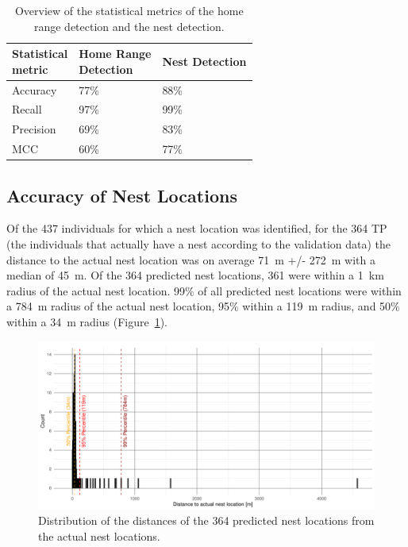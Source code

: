 \vspace{1\baselineskip}

\begin{table}[H]
\begin{center}
\caption[Statistical metrics of the home range detection and the nest detection]{Overview of the statistical metrics of the home range detection and the nest detection.}
\label{table:stats_hr_and_nest}
\begin{tabular}{| p{3cm} | p{3cm} | p{3cm} |} 
\cline{1-3}
\textbf{Statistical \newline metric} & \textbf{Home Range \newline Detection} & \textbf{Nest Detection} \\
\hline
Accuracy & 77\% & 88\% \\ 
\hline
Recall & 97\% & 99\% \\
\hline
Precision & 69\% & 83\% \\
\hline
MCC & 60\% & 77\% \\
\hline
\end{tabular}
\end{center}
\end{table}



\newpage
\subsection{Accuracy of Nest Locations}
Of the 437 individuals for which a nest location was identified, for the 364 TP (the individuals that actually have a nest according to the validation data) the distance to the actual nest location was on average 71~m +/- 272~m with a median of 45~m. Of the 364 predicted nest locations, 361 were within a 1~km radius of the actual nest location. 99\% of all predicted nest locations were within a 784~m radius of the actual nest location, 95\% within a 119~m radius, and 50\% within a 34~m radius (Figure~\ref{figure:nest_dist_barplot}).

\begin{figure}[H]
\centering
\includegraphics[width=1\textwidth]{figures/nest/nest_dist_bar.pdf}
\caption[Distances of the predicted nest locations from the actual nest locations]{Distribution of the distances of the 364 predicted nest locations from the actual nest locations.}
\label{figure:nest_dist_barplot}
\end{figure}

